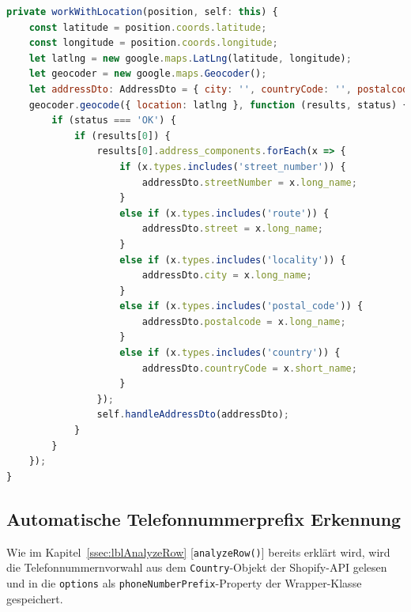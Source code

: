 \begin{lstlisting}[caption={Die \texttt{workWithLocation()}-Methode der \texttt{StreetComponent}-Klasse}, language=JavaScript,label={lst:workWithLocation}]
private workWithLocation(position, self: this) {
	const latitude = position.coords.latitude;
	const longitude = position.coords.longitude;
	let latlng = new google.maps.LatLng(latitude, longitude);
	let geocoder = new google.maps.Geocoder();
	let addressDto: AddressDto = { city: '', countryCode: '', postalcode: '', street: '', streetNumber: '' };
	geocoder.geocode({ location: latlng }, function (results, status) {
		if (status === 'OK') {
			if (results[0]) {
				results[0].address_components.forEach(x => {
					if (x.types.includes('street_number')) {
						addressDto.streetNumber = x.long_name;
					}
					else if (x.types.includes('route')) {
						addressDto.street = x.long_name;
					}
					else if (x.types.includes('locality')) {
						addressDto.city = x.long_name;
					}
					else if (x.types.includes('postal_code')) {
						addressDto.postalcode = x.long_name;
					}
					else if (x.types.includes('country')) {
						addressDto.countryCode = x.short_name;
					}
				});
				self.handleAddressDto(addressDto);
			}
		}
	});
}
\end{lstlisting}

\subsection{Automatische Telefonnummerprefix Erkennung}

Wie im Kapitel~\ref{ssec:lblAnalyzeRow} [\texttt{analyzeRow()}] bereits erklärt wird, wird die Telefonnummernvorwahl aus dem \texttt{Country}-Objekt der Shopify-API gelesen und in die \texttt{options} als \texttt{phoneNumberPrefix}-Property der Wrapper-Klasse gespeichert.